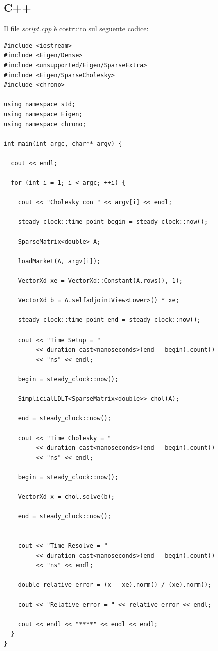 \documentclass[preprint,12pt]{elsarticle}
\begin{document}
\newpage

\subsection*{C++}

Il file \textit{script.cpp} è costruito sul seguente codice:

\begin{verbatim}
#include <iostream>
#include <Eigen/Dense>
#include <unsupported/Eigen/SparseExtra>
#include <Eigen/SparseCholesky>
#include <chrono>

using namespace std;
using namespace Eigen;
using namespace chrono;

int main(int argc, char** argv) {	

  cout << endl;

  for (int i = 1; i < argc; ++i) {

    cout << "Cholesky con " << argv[i] << endl;		
    
    steady_clock::time_point begin = steady_clock::now();

    SparseMatrix<double> A;

    loadMarket(A, argv[i]);

    VectorXd xe = VectorXd::Constant(A.rows(), 1);

    VectorXd b = A.selfadjointView<Lower>() * xe;

    steady_clock::time_point end = steady_clock::now();

    cout << "Time Setup = " 
         << duration_cast<nanoseconds>(end - begin).count() 
         << "ns" << endl;
         
    begin = steady_clock::now();

    SimplicialLDLT<SparseMatrix<double>> chol(A);

    end = steady_clock::now();
    
    cout << "Time Cholesky = " 
         << duration_cast<nanoseconds>(end - begin).count()
         << "ns" << endl;
         
    begin = steady_clock::now();

    VectorXd x = chol.solve(b);
    
    end = steady_clock::now();

  
    cout << "Time Resolve = " 
         << duration_cast<nanoseconds>(end - begin).count() 
         << "ns" << endl;

    double relative_error = (x - xe).norm() / (xe).norm();

    cout << "Relative error = " << relative_error << endl;

    cout << endl << "****" << endl << endl;
  }
}
\end{verbatim}
\end{document}
